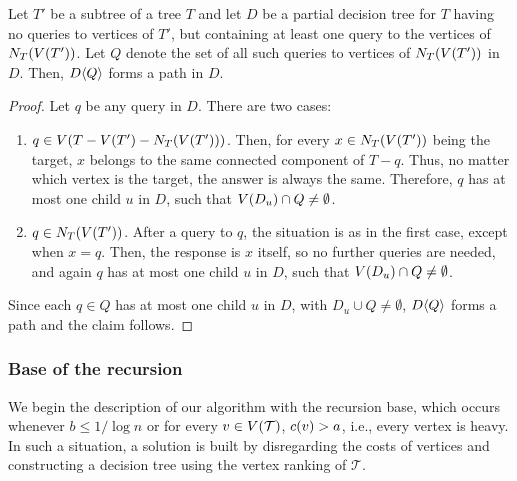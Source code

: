 \begin{observation}\label{neighborsPathObservation}
     Let $T'$ be a subtree of a tree $T$ and let $D$ be a partial decision tree for $T$ having no queries to vertices of $T'$, but containing at least one query to the vertices of $N_{T}\mathopen{}\left( V\mathopen{}\left( T' \right) \right)$. Let $Q$ denote the set of all such queries to vertices of $N_{T}\mathopen{}\left( V\mathopen{}\left( T' \right) \right)$ in $D$. Then, $D\mathopen{}\langle Q \rangle$ forms a path in $D$.  
    \begin{proof}
        Let $q$ be any query in $D$. There are two cases:
        \begin{enumerate}
            \item $q\in V\mathopen{}\left( T-V\mathopen{}\left( T' \right)-N_{T}\mathopen{}\left( V\mathopen{}\left( T' \right) \right) \right)$. Then, for every $x\in N_{T}\mathopen{}\left( V\mathopen{}\left( T' \right) \right)$ being the target, $x$ belongs to the same connected component of $T-q$. Thus, no matter which vertex is the target, the answer is always the same. Therefore, $q$ has at most one child $u$ in $D$, such that $V\mathopen{}\left( D_u \right)\cap Q \neq \emptyset$.
            \item $q\in N_{T}\mathopen{}\left( V\mathopen{}\left( T' \right) \right)$. After a query to $q$, the situation is as in the first case, except when $x=q$. Then, the response is $x$ itself, so no further queries are needed, and again $q$ has at most one child $u$ in $D$, such that $V\mathopen{}\left( D_u \right)\cap Q \neq \emptyset$.
        \end{enumerate} 
        
        Since each $q\in Q$ has at most one child $u$ in $D$, with $D_u\cup Q\neq\emptyset$, $D\mathopen{}\langle Q \rangle$ forms a path and the claim follows.
    \end{proof}
\end{observation}

\subsubsection{Base of the recursion}
We begin the description of our algorithm with the recursion base, which occurs whenever $b\leq{1}/{\log n}$ or for every $v\in V\mathopen{}\left( \mathcal{T} \right)$, $c\mathopen{}\left( v \right)>a$, i.e., every vertex is heavy. In such a situation, a solution is built by disregarding the costs of vertices and constructing a decision tree using the vertex ranking of $\mathcal{T}$. 


